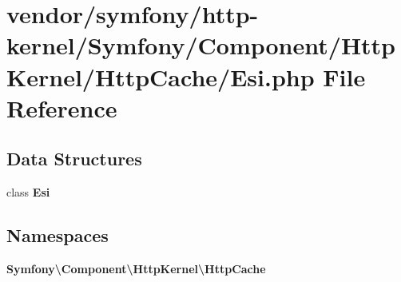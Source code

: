 \section{vendor/symfony/http-\/kernel/\+Symfony/\+Component/\+Http\+Kernel/\+Http\+Cache/\+Esi.php File Reference}
\label{_esi_8php}
\subsection*{Data Structures}
\begin{DoxyCompactItemize}
\item 
class {\bf Esi}
\end{DoxyCompactItemize}
\subsection*{Namespaces}
\begin{DoxyCompactItemize}
\item 
 {\bf Symfony\textbackslash{}\+Component\textbackslash{}\+Http\+Kernel\textbackslash{}\+Http\+Cache}
\end{DoxyCompactItemize}
